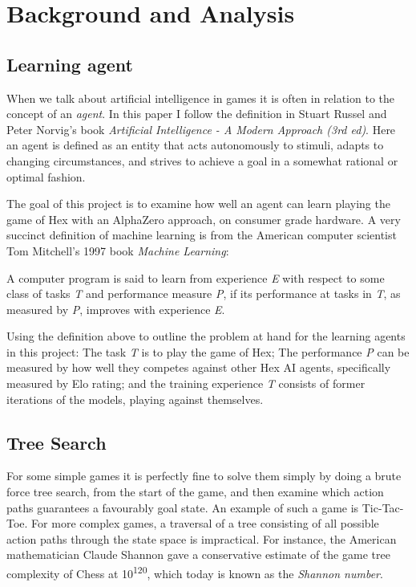 \chapter{Background and Analysis}
\section{Learning agent}
When we talk about artificial intelligence in games it is often in relation to the concept of an \textit{agent}. In this paper I follow the definition in Stuart Russel and Peter Norvig's book \textit{Artificial Intelligence - A Modern Approach (3rd ed)}. Here an agent is defined as an entity that acts autonomously to stimuli, adapts to changing circumstances, and strives to achieve a goal in a somewhat rational or optimal fashion\cite[4-5,15]{Russell2010}.

The goal of this project is to examine how well an agent can learn playing the game of Hex with an AlphaZero approach, on consumer grade hardware. A very succinct definition of machine learning is from the American computer scientist Tom Mitchell's 1997 book \textit{Machine Learning}:
\begin{displayquote}
A computer  program is  said to learn from experience \textit{E} with respect to  some class of tasks \textit{T} and performance  measure \textit{P}, if its performance at  tasks in \textit{T}, as measured by \textit{P}, improves with experience \textit{E}\cite[2]{Mitchell1997}.
\end{displayquote}

Using the definition above to outline the problem at hand for the learning agents in this project: The task \textit{T} is to play the game of Hex; The performance \textit{P} can be measured by how well they competes against other Hex AI agents, specifically measured by Elo rating; and the training experience \textit{T} consists of former iterations of the models, playing against themselves.

\section{Tree Search}
For some simple games it is perfectly fine to solve them simply by doing a brute force tree search, from the start of the game, and then examine which action paths guarantees a favourably goal state. An example of such a game is Tic-Tac-Toe. For more complex games, a traversal of a tree consisting of all possible action paths through the state space is impractical. For instance, the American mathematician Claude Shannon gave a conservative estimate of the game tree complexity of Chess at 10\textsuperscript{120}, which today is known as the \textit{Shannon number}.

